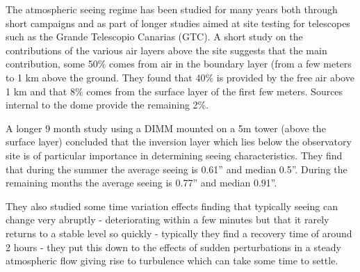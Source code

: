 \documentclass[12pt,a4paper]{article}
\begin{document}
The atmospheric seeing regime has been studied for many years both through short campaigns and as part of longer studies aimed at site testing for telescopes such as the Grande Telescopio Canarias (GTC).
 A short study \citep{vernin92optical} on the contributions of the various air layers above the site suggests that the main contribution, some 50\% comes from air in the boundary layer (from a few meters to 1 km above the ground. They found that 40\% is provided by the free air above 1 km and that 8\% comes from the surface layer of the first few meters. Sources internal to the dome provide the remaining 2\%.

A longer 9 month study \citep{munoz97nighttime} using a DIMM mounted on a 5m tower (above the surface layer) concluded that the inversion layer which lies below the observatory site is of particular importance in determining seeing characteristics. %
They find that during the summer the average seeing is 0.61'' and median 0.5''. During the remaining months the average seeing is 0.77'' and median 0.91''. 

They also studied \citep{munoz97nighttime} some time variation effects finding that typically seeing can change very abruptly - deteriorating within a few minutes but that it rarely returns to a stable level so quickly - typically they find a recovery time of around 2 hours - they put this down to the effects of sudden perturbations in a steady atmospheric flow giving rise to turbulence which can take some time to settle. %

\end{document}
